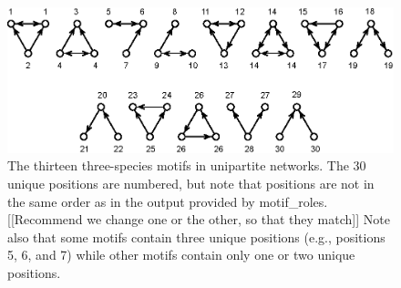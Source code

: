 \documentclass[12pt]{article}
\begin{document}
	\begin{figure}[h!]
		\label{3sp_unipartite}
		\caption{The thirteen three-species motifs in unipartite networks. The 30 unique positions are numbered, but note that positions are not in the same order as in the output provided by motif\_roles. [[Recommend we change one or the other, so that they match]] Note also that some motifs contain three unique positions (e.g., positions 5, 6, and 7) while other motifs contain only one or two unique positions.}
		\includegraphics*[width=\textwidth]{unipartite_motifs.eps}
	\end{figure}
\end{document}
